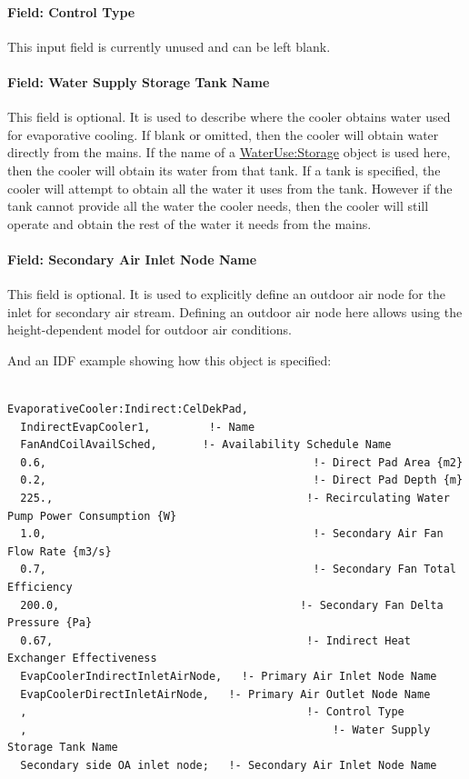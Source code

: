 \paragraph{Field: Control Type}\label{field-control-type-1}

This input field is currently unused and can be left blank.

\paragraph{Field: Water Supply Storage Tank Name}\label{field-water-supply-storage-tank-name-2}

This field is optional. It is used to describe where the cooler obtains water used for evaporative cooling. If blank or omitted, then the cooler will obtain water directly from the mains. If the name of a \hyperref[waterusestorage]{WaterUse:Storage} object is used here, then the cooler will obtain its water from that tank. If a tank is specified, the cooler will attempt to obtain all the water it uses from the tank. However if the tank cannot provide all the water the cooler needs, then the cooler will still operate and obtain the rest of the water it needs from the mains.

\paragraph{Field: Secondary Air Inlet Node Name}\label{field-secondary-air-inlet-node-name-000}

This field is optional. It is used to explicitly define an outdoor air node for the inlet for secondary air stream. Defining an outdoor air node here allows using the height-dependent model for outdoor air conditions.

And an IDF example showing how this object is specified:

\begin{lstlisting}

EvaporativeCooler:Indirect:CelDekPad,
  IndirectEvapCooler1,         !- Name
  FanAndCoilAvailSched,       !- Availability Schedule Name
  0.6,                                         !- Direct Pad Area {m2}
  0.2,                                         !- Direct Pad Depth {m}
  225.,                                       !- Recirculating Water Pump Power Consumption {W}
  1.0,                                         !- Secondary Air Fan Flow Rate {m3/s}
  0.7,                                         !- Secondary Fan Total Efficiency
  200.0,                                     !- Secondary Fan Delta Pressure {Pa}
  0.67,                                       !- Indirect Heat Exchanger Effectiveness
  EvapCoolerIndirectInletAirNode,   !- Primary Air Inlet Node Name
  EvapCoolerDirectInletAirNode,   !- Primary Air Outlet Node Name
  ,                                           !- Control Type
  ,                                               !- Water Supply Storage Tank Name
  Secondary side OA inlet node;   !- Secondary Air Inlet Node Name
\end{lstlisting}

